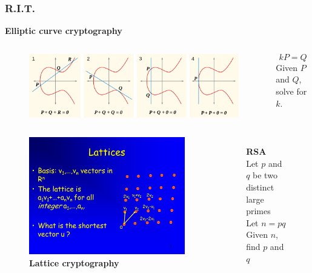 \documentclass{beamer}
\theoremstyle{mystyle}
\begin{document}
\begin{frame}

\frametitle{R.I.T.}
\centering\textbf{Elliptic curve cryptography}
\begin{columns}
	\begin{figure}
		\includegraphics[scale=0.1]{ecc.png}
		
	\end{figure}
		\vspace{-0.2in}
		\begin{center}
			\footnotesize{
			\[kP = Q\]
			Given $P$ and $Q$, solve for $k$.}
		\end{center}
\end{columns}	
	
\begin{columns}
	\begin{figure}
		\includegraphics[scale=0.15]{lattice_crypto.jpg}
		\caption{\textbf{Lattice cryptography}}
	\end{figure}
	\begin{figure}
		\textbf{RSA} \\
		Let $p$ and $q$ be two distinct large primes \\
		Let $n = pq$ \\
		Given $n$, find $p$ and $q$
		
	\end{figure}
\end{columns}

\end{frame}
\end{document}
